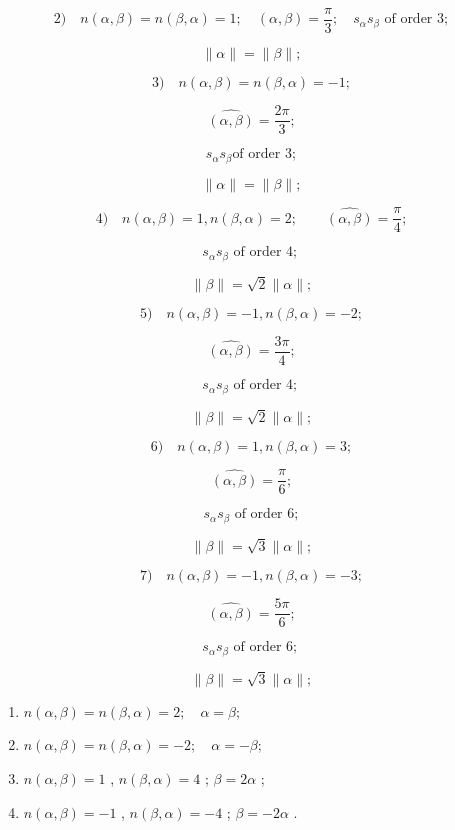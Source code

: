 \[
2) \quad n (\alpha , \beta) = n (\beta , \alpha) = 1; \quad (\alpha , \beta) = \frac {\pi}{3}; \quad s _ {\alpha} s _ {\beta} \text {   of   order   } 3;
\]

\[
\parallel \alpha \parallel = \parallel \beta \parallel ;
\]

\[
3) \quad n (\alpha , \beta) = n (\beta , \alpha) = - 1;
\]

\[
\widehat {(\alpha , \beta)} = \frac {2 \pi}{3};
\]

\[
s _ {\alpha} s _ {\beta} \text {of order 3};
\]

\[
\| \alpha \| = \| \beta \|;
\]

\[
4) \quad n (\alpha , \beta) = 1, n (\beta , \alpha) = 2; \qquad \widehat {(\alpha , \beta)} = \frac {\pi}{4};
\]

\[
s _ {\alpha} s _ {\beta} \text {   of   order   4;   }
\]

\[
\parallel \beta \parallel = \sqrt {2} \parallel \alpha \parallel ;
\]

\[
5) \quad n (\alpha , \beta) = - 1, n (\beta , \alpha) = - 2;
\]

\[
\widehat {(\alpha , \beta)} = \frac {3 \pi}{4};
\]

\[
s _ {\alpha} s _ {\beta} \text {   of   order   4;   }
\]

\[
\parallel \beta \parallel = \sqrt {2} \parallel \alpha \parallel ;
\]

\[
6) \quad n (\alpha , \beta) = 1, n (\beta , \alpha) = 3;
\]

\[
\widehat {(\alpha , \beta)} = \frac {\pi}{6};
\]

\[
s _ {\alpha} s _ {\beta} \text {   of   order   } 6;
\]

\[
\parallel \beta \parallel = \sqrt {3} \parallel \alpha \parallel ;
\]

\[
7) \quad n (\alpha , \beta) = - 1, n (\beta , \alpha) = - 3;
\]

\[
\widehat {(\alpha , \beta)} = \frac {5 \pi}{6};
\]

\[
s _ {\alpha} s _ {\beta} \text {   of   order   6;   }
\]

\[
\parallel \beta \parallel = \sqrt {3} \parallel \alpha \parallel ;
\]

\begin{enumerate}
\def\labelenumi{\arabic{enumi})}
\setcounter{enumi}{7}
\item
  \(n(\alpha, \beta) = n(\beta, \alpha) = 2; \quad \alpha = \beta;\)
\item
  \(n(\alpha, \beta) = n(\beta, \alpha) = -2; \quad \alpha = -\beta;\)
\item
  \(n(\alpha, \beta) = 1\) , \(n(\beta, \alpha) = 4\) ; \(\beta = 2\alpha\) ;
\item
  \(n(\alpha, \beta) = -1\) , \(n(\beta, \alpha) = -4\) ; \(\beta = -2\alpha\) .
\end{enumerate}

